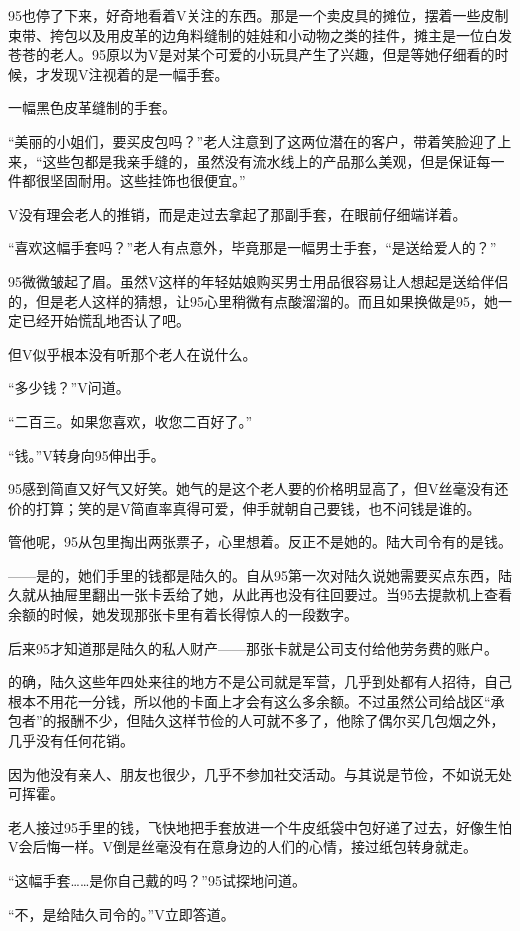 95也停了下来，好奇地看着V关注的东西。那是一个卖皮具的摊位，摆着一些皮制束带、挎包以及用皮革的边角料缝制的娃娃和小动物之类的挂件，摊主是一位白发苍苍的老人。95原以为V是对某个可爱的小玩具产生了兴趣，但是等她仔细看的时候，才发现V注视着的是一幅手套。

一幅黑色皮革缝制的手套。

“美丽的小姐们，要买皮包吗？”老人注意到了这两位潜在的客户，带着笑脸迎了上来，“这些包都是我亲手缝的，虽然没有流水线上的产品那么美观，但是保证每一件都很坚固耐用。这些挂饰也很便宜。”

V没有理会老人的推销，而是走过去拿起了那副手套，在眼前仔细端详着。

“喜欢这幅手套吗？”老人有点意外，毕竟那是一幅男士手套，“是送给爱人的？”

95微微皱起了眉。虽然V这样的年轻姑娘购买男士用品很容易让人想起是送给伴侣的，但是老人这样的猜想，让95心里稍微有点酸溜溜的。而且如果换做是95，她一定已经开始慌乱地否认了吧。

但V似乎根本没有听那个老人在说什么。

“多少钱？”V问道。

“二百三。如果您喜欢，收您二百好了。”

“钱。”V转身向95伸出手。

95感到简直又好气又好笑。她气的是这个老人要的价格明显高了，但V丝毫没有还价的打算；笑的是V简直率真得可爱，伸手就朝自己要钱，也不问钱是谁的。

管他呢，95从包里掏出两张票子，心里想着。反正不是她的。陆大司令有的是钱。

——是的，她们手里的钱都是陆久的。自从95第一次对陆久说她需要买点东西，陆久就从抽屉里翻出一张卡丢给了她，从此再也没有往回要过。当95去提款机上查看余额的时候，她发现那张卡里有着长得惊人的一段数字。

后来95才知道那是陆久的私人财产——那张卡就是公司支付给他劳务费的账户。

的确，陆久这些年四处来往的地方不是公司就是军营，几乎到处都有人招待，自己根本不用花一分钱，所以他的卡面上才会有这么多余额。不过虽然公司给战区“承包者”的报酬不少，但陆久这样节俭的人可就不多了，他除了偶尔买几包烟之外，几乎没有任何花销。

因为他没有亲人、朋友也很少，几乎不参加社交活动。与其说是节俭，不如说无处可挥霍。

老人接过95手里的钱，飞快地把手套放进一个牛皮纸袋中包好递了过去，好像生怕V会后悔一样。V倒是丝毫没有在意身边的人们的心情，接过纸包转身就走。

“这幅手套……是你自己戴的吗？”95试探地问道。

“不，是给陆久司令的。”V立即答道。

